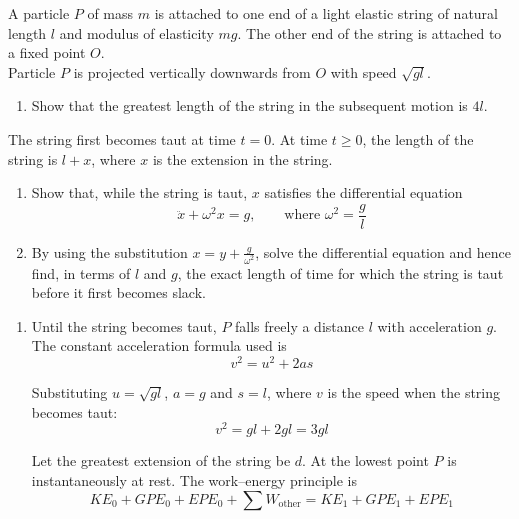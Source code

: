 \documentclass[leqno]{article}
\begin{document}
\begin{enumerate}[
  label=\textbf{\arabic*.},
  leftmargin=*,
  topsep=0pt,
  partopsep=0pt,
  parsep=0pt
]
\newpage

\questionitem

A particle $P$ of mass $m$ is attached to one end of a light elastic string of natural length $l$ and modulus of elasticity $mg$. The other end of the string is attached to a fixed point $O$. \\
Particle $P$ is projected vertically downwards from $O$ with speed $\sqrt{gl}$. \\
\begin{enumerate}[label=\textbf{(\alph*)}]
\item Show that the greatest length of the string in the subsequent motion is $4l$.  \\
\end{enumerate}
The string first becomes taut at time $t=0$. At time $t \ge 0$, the length of the string is $l+x$, where $x$ is the extension in the string. \\
\begin{enumerate}[label=\textbf{(\alph*)},resume]
\item Show that, while the string is taut, $x$ satisfies the differential equation
\[
\ddot{x}+\omega^2 x=g, \qquad \text{where } \omega^2=\dfrac{g}{l}
\]
\item By using the substitution $x=y+\frac{g}{\omega^2}$, solve the differential equation and hence find, in terms of $l$ and $g$, the exact length of time for which the string is taut before it first becomes slack.  \\
\end{enumerate}

\vspace*{10pt}

\begin{djsSolution}
\begin{enumerate}[label=\textbf{(\alph*)}, start=1]
\item Until the string becomes taut, \(P\) falls freely a distance \(l\) with acceleration \(g\). The constant acceleration formula used is
\[
v^2=u^2+2as
\]

Substituting \(u=\sqrt{gl}\), \(a=g\) and \(s=l\), where \(v\) is the speed when the string becomes taut:
\[
v^2=gl+2gl=3gl
\]

Let the greatest extension of the string be \(d\). At the lowest point \(P\) is instantaneously at rest. The work--energy principle is
\[
KE_0 + GPE_0 + EPE_0 + \sum W_{\text{other}} = KE_1 + GPE_1 + EPE_1
\]


\end{enumerate}
\end{djsSolution}
\end{enumerate}
\end{document}

